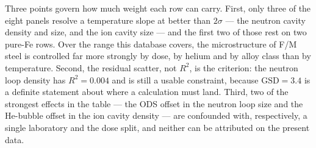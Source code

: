 Three points govern how much weight each row can carry. First, only three of the
eight panels resolve a temperature slope at better than $2\sigma$ --- the neutron
cavity density and size, and the ion cavity size --- and the first two of those
rest on two pure-Fe rows. Over the range this database covers, the microstructure
of F/M steel is controlled far more strongly by dose, by helium and by alloy
class than by temperature. Second, the residual scatter, not $R^{2}$, is the
criterion: the neutron loop density has $R^{2} = 0.004$ and is still a usable
constraint, because $\mathrm{GSD} = 3.4$ is a definite statement about where a
calculation must land. Third, two of the strongest effects in the table --- the
ODS offset in the neutron loop size and the He-bubble offset in the ion cavity
density --- are confounded with, respectively, a single laboratory and the dose
split, and neither can be attributed on the present data.


